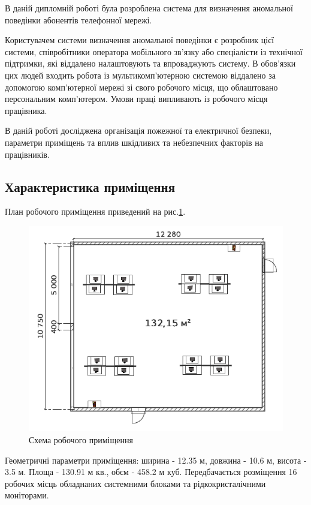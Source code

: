 \newpage
{}
    В даній дипломній роботі була розроблена система для визначення аномальної поведінки абонентів телефонної мережі.

    Користувачем системи визначення аномальної поведінки є розробник цієї системи, співробітники оператора мобільного зв'язку або спеціалісти із технічної підтримки, які віддалено налаштовують та впроваджують систему. В обов'язки цих людей входить робота із мультикомп'ютерною системою віддалено за допомогою комп'ютерної мережі зі свого робочого місця, що облаштовано персональним комп'ютером. Умови праці випливають із робочого місця працівника.

    В даній роботі досліджена організація пожежної та електричної безпеки, параметри приміщень та вплив шкідливих та небезпечних факторів на працівників.
    
\subsection{Характеристика приміщення}
\TBD
    План робочого приміщення приведений на рис.\ref{fig:lab-plan}.
    \begin{figure}[h!]
            \begin{center}
                \includegraphics[scale=0.7]{labour/lab-plan}
            \end{center}
            \caption{Схема робочого приміщення}
            \label{fig:lab-plan}
    \end{figure}

    Геометричні параметри приміщення: ширина - 12.35 м, довжина - 10.6 м, висота - 3.5 м. Площа - 130.91 м кв., обєм - 458.2 м куб.
    Передбачається розміщення 16 робочих місць обладнаних системними блоками та рідкокристалічними моніторами.

